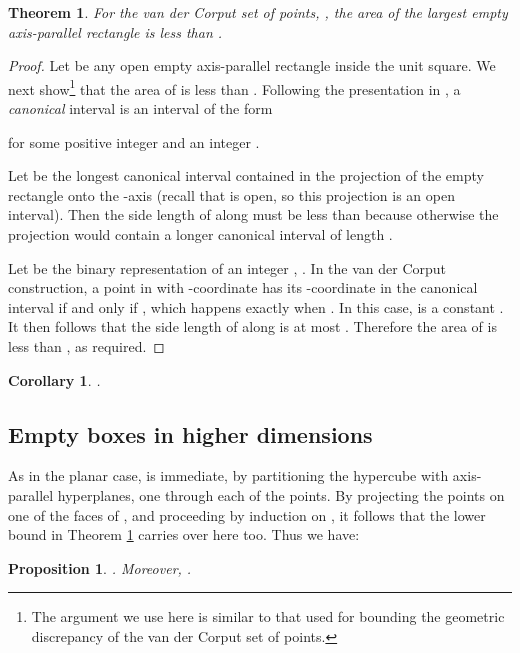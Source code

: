 \documentclass[11pt]{article}
\newtheorem{theorem}{Theorem}
\newtheorem{corollary}{Corollary}
\newtheorem{proposition}{Proposition}
\newcommand{\old}[1]{{}}
\begin{document}
\begin{theorem} \label{T1}
For the van der Corput set of  points, , the area of
the largest empty axis-parallel rectangle is less than .
\end{theorem}
\begin{proof}
Let  be any open empty axis-parallel rectangle inside the unit square.
We next show\footnote{The argument we use here is similar to
that used for bounding the geometric discrepancy of the van der Corput
set of points.} that the area of  is less than . 
Following the presentation in \cite[p.~39]{Ma99},
a \emph{canonical} interval is an interval of the form

for some positive integer  and an integer .

Let 
be the longest canonical interval
contained in the projection of the empty rectangle  onto the -axis
(recall that  is open, so this projection is an open interval).
Then the side length of  along  must be less than
 because otherwise the projection would
contain a longer canonical interval of length .

Let  be the binary representation of
an integer , .
In the van der Corput construction,
a point in  with -coordinate 
has its -coordinate in the canonical interval  if and only if
,
which happens exactly when
.
In this case,  is a constant
.
It then follows that the side length of  along 
is at most .
Therefore the area of  is less than
, as required.
\end{proof}

\begin{corollary} \label{C1}
.
\end{corollary} 


\subsection{Empty boxes in higher dimensions}\label{subsec:higher}

As in the planar case,  is immediate,
by partitioning the hypercube  with  axis-parallel hyperplanes,
one through each of the  points. 
By projecting the  points on one of the faces of ,
and proceeding by induction on , it follows that the lower bound in
Theorem \ref{T1} carries over here too. 
Thus we have:

\begin{proposition} \label{P2}
. Moreover,
. 
\end{proposition}


\old{
By projecting the  points on one of the faces of ,
and proceeding by induction on , it follows that the lower bound in
Theorem \ref{T1} carries over here too. 
That is, . 
} 
\end{document}
